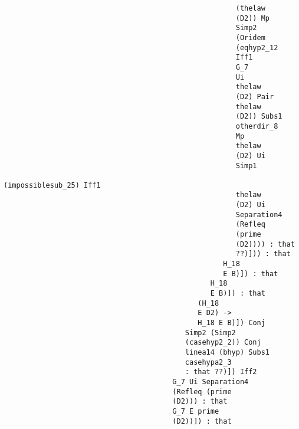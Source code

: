 \documentclass[12pt]{article}
\begin{document}
\begin{verbatim}
                                                       (thelaw 
                                                       (D2)) Mp 
                                                       Simp2 
                                                       (Oridem 
                                                       (eqhyp2_12 
                                                       Iff1 
                                                       G_7 
                                                       Ui 
                                                       thelaw 
                                                       (D2) Pair 
                                                       thelaw 
                                                       (D2)) Subs1 
                                                       otherdir_8 
                                                       Mp 
                                                       thelaw 
                                                       (D2) Ui 
                                                       Simp1 
                                                       (impossiblesub_25) Iff1 
                                                       thelaw 
                                                       (D2) Ui 
                                                       Separation4 
                                                       (Refleq 
                                                       (prime 
                                                       (D2)))) : that 
                                                       ??)])) : that 
                                                    H_18 
                                                    E B)]) : that 
                                                 H_18 
                                                 E B)]) : that 
                                              (H_18 
                                              E D2) -> 
                                              H_18 E B)]) Conj 
                                           Simp2 (Simp2 
                                           (casehyp2_2)) Conj 
                                           linea14 (bhyp) Subs1 
                                           casehypa2_3 
                                           : that ??)]) Iff2 
                                        G_7 Ui Separation4 
                                        (Refleq (prime 
                                        (D2))) : that 
                                        G_7 E prime 
                                        (D2))]) : that 

\end{verbatim}
\end{document}
